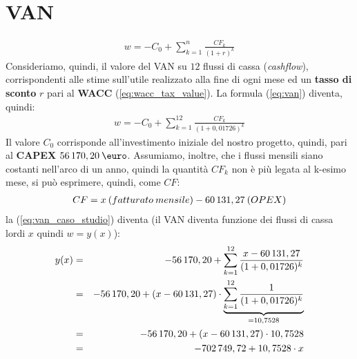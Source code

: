 \section[VAN]{VAN}
	\begin{equation}
	\label{eq:van}
	\begin{split}
 		w = - C_0 + \sum_{k=1}^n \frac{CF_k}{(1+r)^k}
	\end{split}
	\end{equation}
	Consideriamo, quindi, il valore del \ac{VAN} su $12$ flussi di cassa (\textit{cashflow}), corrispondenti alle stime sull'utile realizzato alla fine di ogni mese ed un \textbf{tasso di sconto} $r$ pari al \textbf{\ac{WACC}} (\ref{eq:wacc_tax_value}).\newline
	La formula (\ref{eq:van}) diventa, quindi:	
	\begin{equation}
	\label{eq:van_caso_studio}
	\begin{split}
 		w = - C_0 + \sum_{k=1}^{12} \frac{CF_k}{(1+0,01726)^k}
	\end{split}
	\end{equation}	
	Il valore $C_0$ corrisponde all'investimento iniziale del nostro progetto, quindi, pari al \textbf{CAPEX} $ 56\thinspace 170,20 \: \mbox{\euro}$.
	Assumiamo, inoltre, che i flussi mensili siano costanti nell'arco di un anno, quindi la quantità $CF_k$ non è più legata al k-esimo mese, si può esprimere, quindi, come $CF$:
	\begin{equation}
	\label{eq:flussi_cassa_mensili}
	\begin{split}
 		CF = x \:(fatturato \: mensile) - 60\thinspace 131,27 \: (OPEX)
	\end{split}
	\end{equation}	  	
la (\ref{eq:van_caso_studio}) diventa (il VAN diventa funzione dei flussi di cassa lordi $x$ quindi $w = y(x)$):	
	\begin{eqnarray}
	\label{eq:van_caso_studio_2}
 		y(x) & = & - 56\thinspace 170,20 + \sum_{k=1}^{12} \frac{x - 60\thinspace 131,27}{(1+0,01726)^k} \nonumber \\
 		 & = & -56\thinspace 170,20 + (x - 60\thinspace 131,27) \cdot \underbrace{\sum_{k=1}^{12} \frac{1} {(1+0,01726)^{k}}}_{{}=10,7528} \nonumber \\
 		 & = & -56\thinspace 170,20 + (x - 60\thinspace 131,27) \cdot 10,7528 \nonumber \\
 		 & = & -702\thinspace 749,72 + 10,7528 \cdot x 		
	\end{eqnarray}  		

